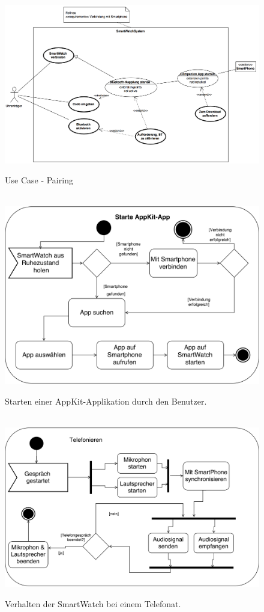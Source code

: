 \begin{appendices}
\begin{figure}[H]
\centering\
\includegraphics[width=14cm]{img/usecase-pairing-p1}
\caption{Use Case - Pairing}\label{fig:usecase-pairing-p1}
\end{figure}

\begin{figure}[h]
\centering\
\includegraphics[width=\textwidth]{img/activityAppKit}
\caption{Starten einer AppKit-Applikation durch den Benutzer.}\label{fig:activityAppKit}
\end{figure}

\begin{figure}[h]
\centering\
\includegraphics[width=\textwidth]{img/activityTelefonieren}
\caption{Verhalten der SmartWatch bei einem Telefonat.}\label{fig:activityTelefonieren}
\end{figure}


\end{appendices}
